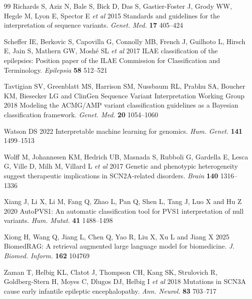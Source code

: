 \documentclass[12pt,a4paper]{article}
\begin{document}
\begin{thebibliography}{99}
Richards S, Aziz N, Bale S, Bick D, Das S, Gastier-Foster J,
Grody WW, Hegde M, Lyon E, Spector E \textit{et al} 2015 Standards
and guidelines for the interpretation of sequence variants.
\textit{Genet. Med.} \textbf{17} 405--424

Scheffer IE, Berkovic S, Capovilla G, Connolly MB, French J,
Guilhoto L, Hirsch E, Jain S, Mathern GW, Mosh\'{e} SL
\textit{et al} 2017 ILAE classification of the epilepsies: Position
paper of the ILAE Commission for Classification and Terminology.
\textit{Epilepsia} \textbf{58} 512--521

Tavtigian SV, Greenblatt MS, Harrison SM, Nussbaum RL, Prabhu SA,
Boucher KM, Biesecker LG and ClinGen Sequence Variant Interpretation
Working Group 2018 Modeling the ACMG/AMP variant classification
guidelines as a Bayesian classification framework.
\textit{Genet. Med.} \textbf{20} 1054--1060

Watson DS 2022 Interpretable machine learning for genomics.
\textit{Hum. Genet.} \textbf{141} 1499--1513

Wolff M, Johannesen KM, Hedrich UB, Masnada S, Rubboli G,
Gardella E, Lesca G, Ville D, Milh M, Villard L \textit{et al} 2017
Genetic and phenotypic heterogeneity suggest therapeutic implications
in SCN2A-related disorders.
\textit{Brain} \textbf{140} 1316--1336

Xiang J, Li X, Li M, Fang Q, Zhao L, Pan Q, Shen L, Tang J,
Luo X and Hu Z 2020 AutoPVS1: An automatic classification tool for
PVS1 interpretation of null variants.
\textit{Hum. Mutat.} \textbf{41} 1488--1498

Xiong H, Wang Q, Jiang L, Chen Q, Yao R, Liu X, Xu L and Jiang X
2025 BiomedRAG: A retrieval augmented large language model for
biomedicine.
\textit{J. Biomed. Inform.} \textbf{162} 104769

Zaman T, Helbig KL, Clatot J, Thompson CH, Kang SK, Strulovich R,
Goldberg-Stern H, Moyes C, Dlugos DJ, Helbig I \textit{et al} 2018
Mutations in SCN3A cause early infantile epileptic encephalopathy.
\textit{Ann. Neurol.} \textbf{83} 703--717

\end{thebibliography}
\end{document}

